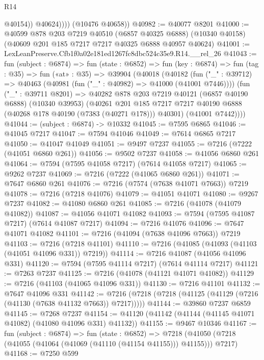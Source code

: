 \begin{lexlean}{R14}
\begin{coremodule}
                  @40154))
              @40624))))
      (@10476 @40658))
@40982 := @40077 @8201
@41000 := @40599
    @878
    @203
    @7219
    @40510
    (@6857 @40325 @6888)
    (@10340 @40158)
    (@40609 @201 @185 @7217 @7217 @40325 @6888 @40957 @40624)
@41001 := LexLeanPreserve.Cfb1f0a02e181ed1267fc8dbc524c35e9.R14.__rel_26
@41043 := fun (subject : @6874) =>
  fun (state : @6852) =>
  fun (key : @6874) =>
  fun (tag : @35) =>
  fun («at» : @35) =>
  @39904
    (@40018
      (@40182
        (fun ("_" : @39712) => @40463 (@40981 (fun ("_" : @40982) => @41000 (@41001 @7446))))
        (fun ("_" : @39711 @8201) =>
        @40282
          @878
          @203
          @7219
          @40121
          (@6857 @40190 @6888)
          (@10340 @39953)
          (@40261
            @201
            @185
            @7217
            @7217
            @40190
            @6888
            (@40268 @178 @40190 (@7383 (@40271 @178)))
            @40301)
          (@41001 @7442))))
@41044 := (subject : @6874) -> @10332
@41045 := @7595 @6865
@41046 := @41045 @7217
@41047 := @7594 @41046
@41049 := @7614 @6865 @7217
@41050 := @41047 @41049
@41051 := @9497 @7237
@41055 := @7216 (@7222 (@41051 @6860 @261))
@41056 := @9502 @7237
@41058 := @41056 @6860 @261
@41064 := @7594 (@7595 @41058 @7217) (@7614 @41058 @7217)
@41065 := @9262 @7237
@41069 := @7216 (@7222 (@41065 @6860 @261))
@41071 := @7647 @6860 @261
@41076 := @7216 (@7574 (@7638 @41071 @7663)) @7219
@41078 := @7216 (@7218 @41076)
@41079 := @41051 @41071
@41080 := @9267 @7237
@41082 := @41080 @6860 @261
@41085 := @7216 (@41078 (@41079 @41082))
@41087 := @41056 @41071 @41082
@41093 := @7594 (@7595 @41087 @7217) (@7614 @41087 @7217)
@41094 := @7216 @41076
@41096 := @7647 @41071 @41082
@41101 := @7216 (@41094 (@7638 @41096 @7663)) @7219
@41103 := @7216 (@7218 @41101)
@41110 := @7216 (@41085 (@41093 (@41103 (@41051 @41096 @331)) @7219))
@41114 := @7216 @41087 (@41056 @41096 @331)
@41120 := @7594 (@7595 @41114 @7217) (@7614 @41114 @7217)
@41121 := @7263 @7237
@41125 := @7216 (@41078 (@41121 @41071 @41082))
@41129 := @7216 (@41103 (@41065 @41096 @331))
@41130 := @7216 @41101
@41132 := @7647 @41096 @331
@41142 := @7216 (@7218 (@7218 (@41125 (@41129 (@7216 (@41130 (@7638 @41132 @7663)) @7217)))))
@41144 := @39860 @7237 @6859
@41145 := @7268 @7237
@41154 := @41120 (@41142 (@41144 (@41145 @41071 @41082) (@41080 @41096 @331) @41132))
@41155 := @9467 @10346
@41167 := fun (subject : @6874) =>
  fun (state : @6852) =>
  @7218 (@41050 (@7218 (@41055 (@41064 (@41069 (@41110 (@41154 @41155))) @41155))) @7217)
@41168 := @7250 @599

\end{coremodule}
\end{lexlean}
